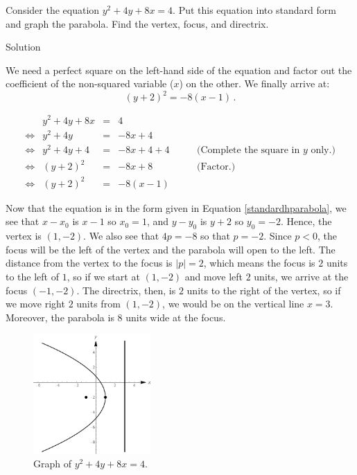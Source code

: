 \begin{example} \label{ctsparabolaex} 
Consider the equation $y^2 + 4y + 8x = 4$.  Put this equation into standard form and graph the parabola.  Find the vertex, focus, and directrix.   

Solution 

 We need a perfect square on the left-hand side of the equation and factor out the coefficient of the non-squared variable ($x$) on the other.
 \ifanalysis
 We finally arrive at:
 $$
 (y+2)^2  =  -8(x-1)\,.
 $$
 \fi

\ifcalculus
\[ \begin{array}{rrclr} 
&y^2+4y+8x &  = & 4 & \\
\Leftrightarrow&y^2 + 4y &  = & -8x + 4 &  \\
\Leftrightarrow&y^2+4y+4 & = & -8x+4+4 & \qquad\mbox{(Complete the square in $y$ only.)} \\
\Leftrightarrow&(y+2)^2 & = &-8x+8 & \qquad\mbox{(Factor.)}  \\ 
\Leftrightarrow&(y+2)^2 & = & -8(x-1) &   \end{array} \]
\fi

Now that the equation is in the form given in Equation \eqref{standardhparabola}, we see that  $x-x_0$ is $x-1$ so $x_0 = 1$, and  $y-y_0$ is $y+2$ so $y_0 = -2$.  Hence, the vertex is $(1,-2)$.  We also see that $4p = -8$ so that $p = -2$.  Since $p < 0$, the focus will be the left of the vertex and the parabola will open to the left.  The distance from the vertex to the focus is $|p| = 2$, which means the focus is $2$ units to the left of $1$, so if we start at $(1,-2)$ and move left $2$ units, we arrive at the focus $(-1,-2)$. The directrix, then, is $2$ units to the right of the vertex, so if we move right $2$ units from $(1,-2)$, we would be on the vertical line $x=3$.  Moreover, the parabola is $8$ units wide at the focus.

\begin{figure}[H]
	\begin{center}
			\includegraphics[width=0.4\textwidth]{fig_algebraic_29}
	\caption{Graph of $y^2+4y+8x=4$.}
	\label{fig_algebraic_29}
	\end{center}
\end{figure}

\end{example}

